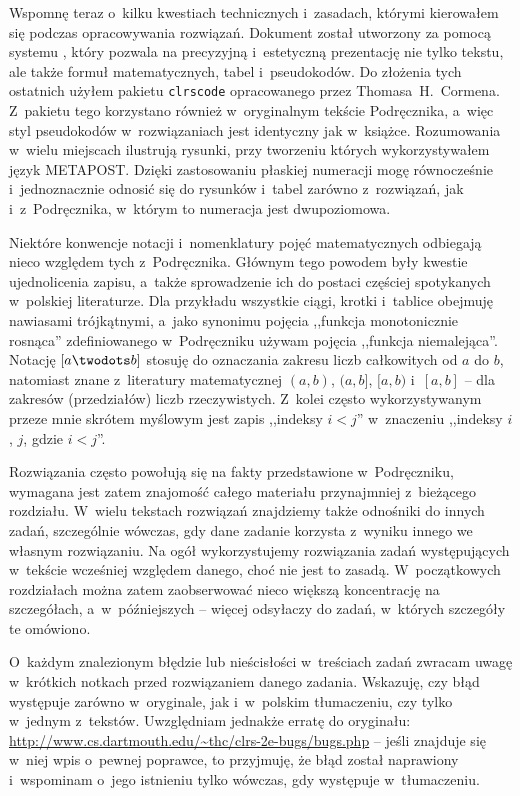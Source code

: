 Wspomnę teraz o~kilku kwestiach technicznych i~zasadach, którymi kierowałem się podczas opracowywania rozwiązań. Dokument został utworzony za pomocą systemu \LaTeXe, który pozwala na precyzyjną i~estetyczną prezentację nie tylko tekstu, ale także formuł matematycznych, tabel i~pseudokodów. Do złożenia tych ostatnich użyłem pakietu \texttt{clrscode} opracowanego przez Thomasa~H.~Cormena. Z~pakietu tego korzystano również w~oryginalnym tekście Podręcznika, a~więc styl pseudokodów w~rozwiązaniach jest identyczny jak w~książce. Rozumowania w~wielu miejscach ilustrują rysunki, przy tworzeniu których wykorzystywałem język {\manual META}{\manual POST}. Dzięki zastosowaniu płaskiej numeracji mogę równocześnie i~jednoznacznie odnosić się do rysunków i~tabel zarówno z~rozwiązań, jak i~z~Podręcznika, w~którym to numeracja jest dwupoziomowa.

Niektóre konwencje notacji i~nomenklatury pojęć matematycznych odbiegają nieco względem tych z~Podręcznika. Głównym tego powodem były kwestie ujednolicenia zapisu, a~także sprowadzenie ich do postaci częściej spotykanych w~polskiej literaturze. Dla przykładu wszystkie ciągi, krotki i~tablice obejmuję nawiasami trójkątnymi, a~jako synonimu pojęcia ,,funkcja monotonicznie rosnąca'' zdefiniowanego w~Podręczniku używam pojęcia ,,funkcja niemalejąca''. Notację $[a\twodots b]$ stosuję do oznaczania zakresu liczb całkowitych od $a$ do $b$, natomiast znane z~literatury matematycznej $(a,b)$, $(a,b]$, $[a,b)$ i~$[a,b]$ -- dla zakresów (przedziałów) liczb rzeczywistych. Z~kolei często wykorzystywanym przeze mnie skrótem myślowym jest zapis ,,indeksy $i<j$'' w~znaczeniu ,,indeksy $i$, $j$, gdzie $i<j$''.

Rozwiązania często powołują się na fakty przedstawione w~Podręczniku, wymagana jest zatem znajomość całego materiału przynajmniej z~bieżącego rozdziału. W~wielu tekstach rozwiązań znajdziemy także odnośniki do innych zadań, szczególnie wówczas, gdy dane zadanie korzysta z~wyniku innego we własnym rozwiązaniu. Na ogół wykorzystujemy rozwiązania zadań występujących w~tekście wcześniej względem danego, choć nie jest to zasadą. W~początkowych rozdziałach można zatem zaobserwować nieco większą koncentrację na szczegółach, a~w~późniejszych -- więcej odsyłaczy do zadań, w~których szczegóły te omówiono.

O~każdym znalezionym błędzie lub nieścisłości w~treściach zadań zwracam uwagę w~krótkich notkach przed rozwiązaniem danego zadania. Wskazuję, czy błąd występuje zarówno w~oryginale, jak i~w~polskim tłumaczeniu, czy tylko w~jednym z~tekstów. Uwzględniam jednakże erratę do oryginału: \url{http://www.cs.dartmouth.edu/~thc/clrs-2e-bugs/bugs.php} -- jeśli znajduje się w~niej wpis o~pewnej poprawce, to przyjmuję, że błąd został naprawiony i~wspominam o~jego istnieniu tylko wówczas, gdy występuje w~tłumaczeniu.


